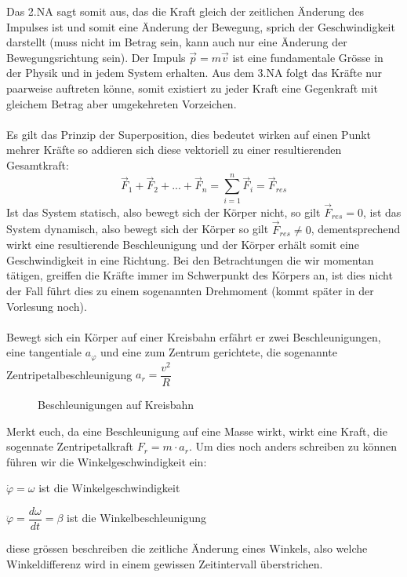 \documentclass[12pt]{article}
\begin{document}
Das 2.NA sagt somit aus, das die Kraft gleich der zeitlichen Änderung des Impulses ist und somit eine Änderung der Bewegung, sprich der Geschwindigkeit darstellt (muss nicht im Betrag sein, kann auch nur eine Änderung der Bewegungsrichtung sein). Der Impuls $\vec{p} = m\vec{v}$ ist eine fundamentale Grösse in der Physik und in jedem System erhalten. Aus dem 3.NA folgt das Kräfte nur paarweise auftreten könne, somit existiert zu jeder Kraft eine Gegenkraft mit gleichem Betrag aber umgekehreten Vorzeichen.\\
\\ Es gilt das Prinzip der Superposition, dies bedeutet wirken auf einen Punkt mehrer Kräfte so addieren sich diese vektoriell zu einer resultierenden Gesamtkraft:
\begin{equation}
\vec{F}_1 + \vec{F}_2 +...+ \vec{F}_n = \sum_{i=1}^n \vec{F}_i = \vec{F}_{res}
\end{equation}
Ist das System statisch, also bewegt sich der Körper nicht, so gilt $\vec{F}_{res} = 0 $, ist das System dynamisch, also bewegt sich der Körper so gilt $\vec{F}_{res} \ne 0$, dementsprechend wirkt eine resultierende Beschleunigung und der Körper erhält somit eine Geschwindigkeit in eine Richtung. Bei den Betrachtungen die wir momentan tätigen, greiffen die Kräfte immer im Schwerpunkt des Körpers an, ist dies nicht der Fall führt dies zu einem sogenannten Drehmoment (kommt später in der Vorlesung noch).
\\
\\
Bewegt sich ein Körper auf einer Kreisbahn erfährt er zwei Beschleunigungen, eine tangentiale $a_{\varphi}$ und eine zum Zentrum gerichtete, die sogenannte Zentripetalbeschleunigung $a_r = \dfrac{v^2}{R}$
\begin{figure}[H]
  \caption{Beschleunigungen auf Kreisbahn}
  \label{fig:1teil}
\end{figure} 
Merkt euch, da eine Beschleunigung auf eine Masse wirkt, wirkt eine Kraft, die sogennate Zentripetalkraft $F_r = m \cdot a_r$. Um dies noch anders schreiben zu können führen wir die Winkelgeschwindigkeit ein:
\begin{itemize}
$\dot{\varphi} = \omega$ ist die Winkelgeschwindigkeit 
\end{itemize}
\begin{itemize}
$\ddot{\varphi} = \dfrac{d\omega}{dt} = \beta$ ist die Winkelbeschleunigung
\end{itemize}
diese grössen beschreiben die zeitliche Änderung eines Winkels, also welche Winkeldifferenz wird in einem gewissen Zeitintervall überstrichen.
\end{document}
